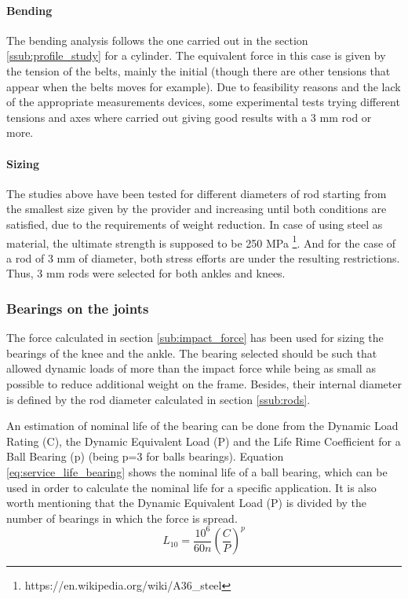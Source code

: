   \paragraph{Bending} %
  \label{ssub:bending}
  The bending analysis follows the one carried out in the section \ref{ssub:profile_study} for a cylinder.
  The equivalent force in this case is given by the tension of the belts, mainly the initial (though there are other tensions that appear when the belts moves for example).
  Due to feasibility reasons and the lack of the appropriate measurements devices, some experimental tests trying different tensions and axes where carried out giving good results with a 3 mm rod or more.

  \paragraph{Sizing} %
  \label{ssub:sizing}
  The studies above have been tested for different diameters of rod starting from the smallest size given by the provider and increasing until both conditions are satisfied, due to the requirements of weight reduction.
  In case of using steel as material, the ultimate strength is supposed to be 250 MPa \footnote{https://en.wikipedia.org/wiki/A36\_steel}.
  And for the case of a rod of 3 mm of diameter, both stress efforts are under the resulting restrictions.
  Thus, 3 mm rods were selected for both ankles and knees.

\subsubsection{Bearings on the joints} %
\label{ssub:bearings}
The force calculated in section \ref{sub:impact_force} has been used for sizing the bearings of the knee and the ankle.
The bearing selected should be such that allowed dynamic loads of more than the impact force while being as small as possible to reduce additional weight on the frame.
Besides, their internal diameter is defined by the rod diameter calculated in section \ref{ssub:rods}.

An estimation of nominal life of the bearing can be done from the Dynamic Load Rating (C), the Dynamic Equivalent Load (P) and the Life Rime Coefficient for a Ball Bearing (p) (being p=3 for balls bearings).
Equation \ref{eq:service_life_bearing} shows the nominal life of a ball bearing, which can be used in order to calculate the nominal life for a specific application.
It is also worth mentioning that the Dynamic Equivalent Load (P) is divided by the number of bearings in which the force is spread.
\begin{equation}
  \label{eq:service_life_bearing}
  L_{10} = \frac{10^{6}}{60 n} \left(\frac{C}{P}\right)^{p}
\end{equation}

